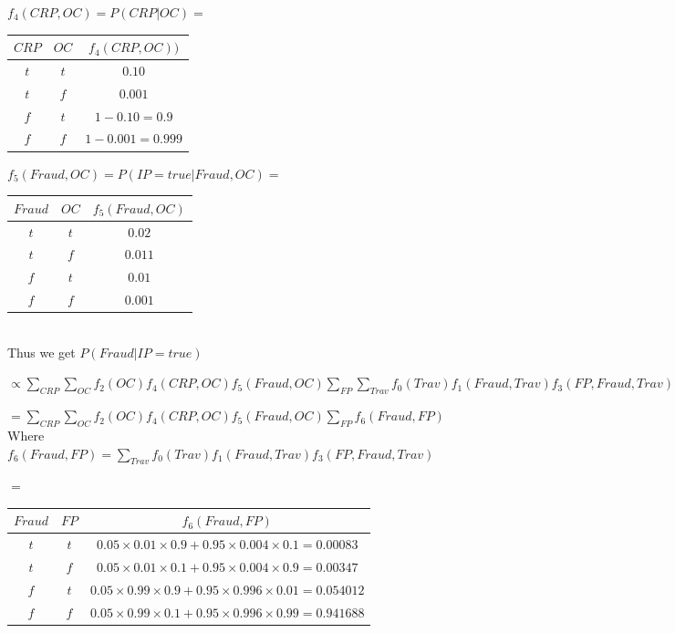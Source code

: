 \documentclass[10pt]{article}
\begin{document}
\begin{enumerate}
	$f_4(CRP, OC) = P(CRP | OC) = $
	\begin{tabular}{|c|c|c|}
	\hline
 	  $CRP$ & $OC$ & $f_4(CRP, OC))$ \\
	\hline
	  $t$ & $t$ & $0.10$  \\
	\hline
	 $t$ & $f$ & $0.001$  \\
	\hline
	 $f$ & $t$ & $1 - 0.10 = 0.9$ \\
	\hline
	$f$ & $f$ & $1 - 0.001 = 0.999$  \\
	\hline
	\end{tabular}
	
	$f_5(Fraud, OC) = P(IP = true | Fraud, OC) = $
	\begin{tabular}{|c|c|c|}
	\hline
 	  $Fraud$ & $OC$ & $f_5(Fraud, OC)$ \\
	\hline
	  $t$ & $t$ & $0.02$  \\
	\hline
	 $t$ & $f$ & $0.011$  \\
	\hline
	  $f$ & $t$ & $0.01$ \\
	\hline
	$f$ & $f$ & $0.001$  \\
	\hline
	\end{tabular}\\
	
	Thus we get $P(Fraud | IP = true)$
	
	$\propto \sum_{CRP} \sum_{OC} f_2(OC) f_4(CRP, OC) f_5(Fraud, OC) \sum_{FP} \sum_{Trav} f_0(Trav) f_1(Fraud, Trav) f_3(FP, Fraud, Trav)$
	
	$= \sum_{CRP} \sum_{OC} f_2(OC) f_4(CRP, OC) f_5(Fraud, OC) \sum_{FP} f_6(Fraud, FP)$\\
	
	Where $f_6(Fraud, FP) = \sum_{Trav} f_0(Trav) f_1(Fraud, Trav) f_3(FP, Fraud, Trav)$
	
	$=$
	\begin{tabular}{|c|c|c|}
	\hline
 	  $Fraud$ & $FP$ & $f_6(Fraud, FP)$ \\
	\hline
	  $t$ & $t$ & $0.05 \times 0.01 \times 0.9 + 0.95 \times 0.004 \times 0.1 = 0.00083$  \\
	\hline
	 $t$ & $f$ & $0.05 \times 0.01 \times 0.1 + 0.95 \times 0.004 \times 0.9 = 0.00347$  \\
	\hline
	  $f$ & $t$ & $0.05 \times 0.99 \times 0.9 + 0.95 \times 0.996 \times 0.01 = 0.054012 $ \\
	\hline
	$f$ & $f$ & $0.05 \times 0.99 \times 0.1 + 0.95 \times 0.996 \times 0.99 = 0.941688 $  \\
	\hline
	\end{tabular}\\	
		

\end{enumerate}
\end{document}
